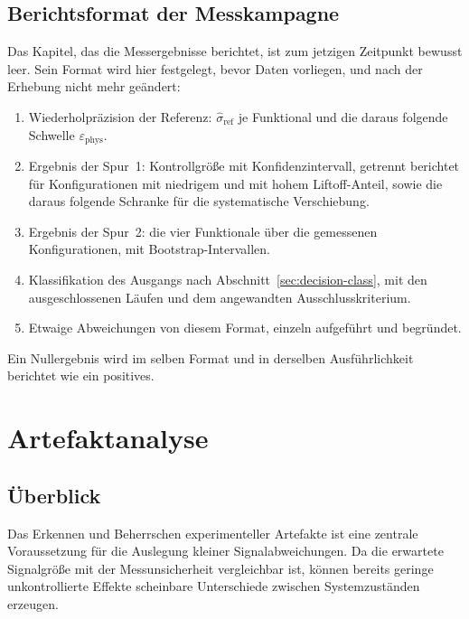 \documentclass[12pt,a4paper]{report}
\begin{document}
\section{Berichtsformat der Messkampagne}

Das Kapitel, das die Messergebnisse berichtet, ist zum jetzigen Zeitpunkt
bewusst leer. Sein Format wird hier festgelegt, bevor Daten vorliegen,
und nach der Erhebung nicht mehr geändert:

\begin{enumerate}
  \item Wiederholpräzision der Referenz:
        $\hat{\sigma}_{\mathrm{ref}}$ je Funktional und die daraus
        folgende Schwelle $\varepsilon_{\mathrm{phys}}$.
  \item Ergebnis der Spur~1: Kontrollgröße mit Konfidenzintervall,
        getrennt berichtet für Konfigurationen mit niedrigem und mit
        hohem Liftoff-Anteil, sowie die daraus folgende Schranke für die
        systematische Verschiebung.
  \item Ergebnis der Spur~2: die vier Funktionale über die gemessenen
        Konfigurationen, mit Bootstrap-Intervallen.
  \item Klassifikation des Ausgangs nach
        Abschnitt~\ref{sec:decision-class}, mit den ausgeschlossenen
        Läufen und dem angewandten Ausschlusskriterium.
  \item Etwaige Abweichungen von diesem Format, einzeln aufgeführt und
        begründet.
\end{enumerate}

Ein Nullergebnis wird im selben Format und in derselben Ausführlichkeit
berichtet wie ein positives.


\chapter{Artefaktanalyse}
\label{chap:artefakt}

\section{Überblick}

Das Erkennen und Beherrschen experimenteller Artefakte ist eine zentrale
Voraussetzung für die Auslegung kleiner Signalabweichungen. Da die
erwartete Signalgröße mit der Messunsicherheit vergleichbar ist, können
bereits geringe unkontrollierte Effekte scheinbare Unterschiede zwischen
Systemzuständen erzeugen.
\end{document}
